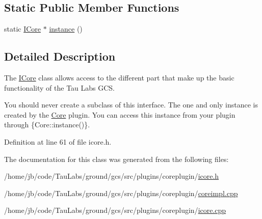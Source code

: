 \subsection*{\-Static \-Public \-Member \-Functions}
\begin{DoxyCompactItemize}
\item 
static \hyperlink{class_core_1_1_i_core}{\-I\-Core} $\ast$ \hyperlink{group___core_plugin_ga71099762904aac0b404fcd1f93bdc83e}{instance} ()
\end{DoxyCompactItemize}


\subsection{\-Detailed \-Description}
\-The \hyperlink{class_core_1_1_i_core}{\-I\-Core} class allows access to the different part that make up the basic functionality of the \-Tau \-Labs \-G\-C\-S. 

\-You should never create a subclass of this interface. \-The one and only instance is created by the \hyperlink{namespace_core}{\-Core} plugin. \-You can access this instance from your plugin through {\ttfamily }\{\-Core\-::instance()\}.

\-Definition at line 61 of file icore.\-h.



\-The documentation for this class was generated from the following files\-:\begin{DoxyCompactItemize}
\item 
/home/jb/code/\-Tau\-Labs/ground/gcs/src/plugins/coreplugin/\hyperlink{icore_8h}{icore.\-h}\item 
/home/jb/code/\-Tau\-Labs/ground/gcs/src/plugins/coreplugin/\hyperlink{coreimpl_8cpp}{coreimpl.\-cpp}\item 
/home/jb/code/\-Tau\-Labs/ground/gcs/src/plugins/coreplugin/\hyperlink{icore_8cpp}{icore.\-cpp}\end{DoxyCompactItemize}
